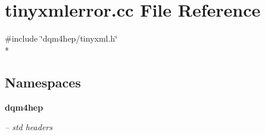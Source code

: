 \section{tinyxmlerror.\+cc File Reference}
\label{tinyxmlerror_8cc}
{\ttfamily \#include \char`\"{}dqm4hep/tinyxml.\+h\char`\"{}}\\*
\subsection*{Namespaces}
\begin{DoxyCompactItemize}
\item 
 {\bf dqm4hep}
\begin{DoxyCompactList}\small\item\em -- std headers \end{DoxyCompactList}\end{DoxyCompactItemize}
